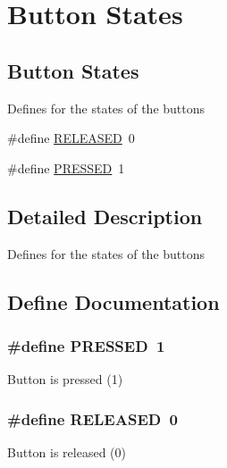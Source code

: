 \hypertarget{group__btn_defs}{\section{Button States}
\label{group__btn_defs}
}
\subsection*{Button States}
\label{_amgrp409d9ecbe843e5044ebf0423607a25c6}%
 Defines for the states of the buttons \begin{DoxyCompactItemize}
\item 
\#define \hyperlink{group__btn_defs_gad74b7f5218b46c8332cd531df7178d45}{R\-E\-L\-E\-A\-S\-E\-D}~0
\item 
\#define \hyperlink{group__btn_defs_ga654adff3c664f27f0b29c24af818dd26}{P\-R\-E\-S\-S\-E\-D}~1
\end{DoxyCompactItemize}


\subsection{Detailed Description}
Defines for the states of the buttons 

\subsection{Define Documentation}
\hypertarget{group__btn_defs_ga654adff3c664f27f0b29c24af818dd26}{
\subsubsection[{P\-R\-E\-S\-S\-E\-D}]{\setlength{\rightskip}{0pt plus 5cm}\#define {\bf P\-R\-E\-S\-S\-E\-D}~1}}\label{group__btn_defs_ga654adff3c664f27f0b29c24af818dd26}
Button is pressed (1) \hypertarget{group__btn_defs_gad74b7f5218b46c8332cd531df7178d45}{
\subsubsection[{R\-E\-L\-E\-A\-S\-E\-D}]{\setlength{\rightskip}{0pt plus 5cm}\#define {\bf R\-E\-L\-E\-A\-S\-E\-D}~0}}\label{group__btn_defs_gad74b7f5218b46c8332cd531df7178d45}
Button is released (0) 